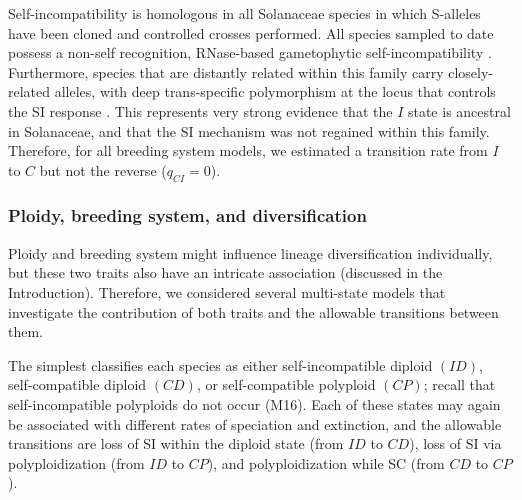 Self-incompatibility is homologous in all Solanaceae species in which S-alleles have been cloned and controlled crosses performed.
All species sampled to date possess a non-self recognition, RNase-based gametophytic self-incompatibility \citep[shared even with other euasterid families;][]{ramanauskas_2017}.
Furthermore, species that are distantly related within this family carry closely-related alleles, with deep trans-specific polymorphism at the locus that controls the SI response \citep{ioerger_1990, igic_2006}.
This represents very strong evidence that the $I$ state is ancestral in Solanaceae, and that the SI mechanism was not regained within this family.
Therefore, for all breeding system models, we estimated a transition rate from $I$ to $C$  but not the reverse ($q_{CI}=0$).
%

\subsubsection{Ploidy, breeding system, and diversification}

Ploidy and breeding system might influence lineage diversification individually, but these two traits also have an intricate association (discussed in the Introduction).
Therefore, we considered several multi-state models that investigate the contribution of both traits and the allowable transitions between them.

The simplest classifies each species as either self-incompatible diploid $(ID)$, self-compatible diploid $(CD)$, or self-compatible polyploid $(CP)$; recall that self-incompatible polyploids do not occur (M16).
Each of these states may again be associated with different rates of speciation and extinction, and the allowable transitions are loss of SI within the diploid state (from $ID$ to $CD$), loss of SI via polyploidization (from $ID$ to $CP$), and polyploidization while SC (from $CD$ to $CP$).

